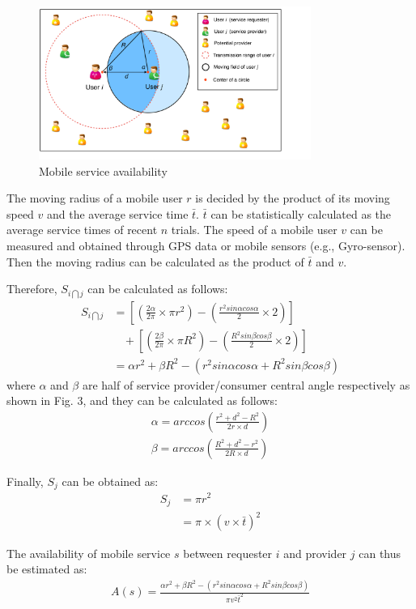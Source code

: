 \documentclass[journal]{IEEEtran}
\begin{document}
\begin{figure}[!t]
\centering
\includegraphics[width=3.5in]{./img/pic3.pdf}
\caption{Mobile service availability}
\label{fig_sd}
\end{figure}

The moving radius of a mobile user $r$ is decided by the product of its moving speed $v$ and the average service time $\bar{t}$. $\bar{t}$ can be statistically calculated as the average service times of recent $n$ trials.
The speed of a mobile user $v$ can be measured and obtained through GPS data or mobile sensors (e.g., Gyro-sensor). Then the moving radius can be calculated as the product of $\bar{t}$ and $v$.

Therefore, $S_{i \bigcap j}$ can be calculated as follows:
\begin{align}
S_{i \bigcap j} & =  [(\frac{2\alpha}{2\pi} \times \pi r^2)-(\frac{r^2 sin\alpha cos\alpha}{2} \times 2)]\\\nonumber
& \ \ \ \ +[(\frac{2\beta}{2\pi} \times \pi R^2)-(\frac{R^2 sin\beta cos\beta}{2} \times 2)]\\\nonumber
& = \alpha r^2 + \beta R^2 - (r^2 sin\alpha cos\alpha + R^2 sin\beta cos\beta)
\end{align}
where $\alpha$ and $\beta$ are half of service provider/consumer central angle respectively as shown in Fig. 3, and they can be calculated as follows:
\begin{eqnarray}
\alpha = arccos(\frac{r^2+d^2-R^2}{2r\times d}) \\\nonumber
\beta = arccos(\frac{R^2+d^2-r^2}{2R\times d})
\end{eqnarray}

Finally, $S_j$ can be obtained as:
\begin{align}
S_j & = \pi r^2 \\\nonumber
& = \pi \times (v \times \bar{t})^2
\end{align}

The availability of mobile service $s$ between requester $i$ and provider $j$ can thus be estimated as:
\begin{align}
A(s) = \frac{\alpha r^2 + \beta R^2 - (r^2 sin\alpha cos\alpha + R^2 sin\beta cos\beta)}{\pi v^2 \bar{t}^2}
\end{align}
\end{document}
